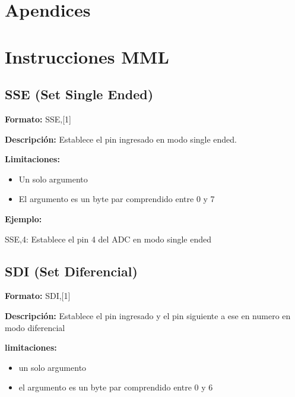 \documentclass{article}
\theoremstyle{definition}
\theoremstyle{remark}
\begin{document}
\clearpage


\section{Apendices} %
\label{sec:apendices}


\appendix
\section{Instrucciones MML} %
\label{sec:instrucciones_mml}


\subsection{SSE (Set Single Ended)} %
\label{sub:sse_set_single_ended}


\textbf{Formato:} SSE,[1]

\textbf{Descripci\'on:}
Establece el pin ingresado en modo single ended.

\textbf{Limitaciones:}
\begin{itemize}
  \item Un solo argumento
  \item El argumento es un byte par comprendido entre 0 y 7
\end{itemize}

\textbf{Ejemplo:}

SSE,4: Establece el pin 4 del ADC en modo single ended


\subsection{SDI (Set Diferencial)} %
\label{sub:sdi_set_diferencial}


\textbf{Formato:} SDI,[1]

\textbf{Descripci\'on:}
Establece el pin ingresado y el pin siguiente a ese en numero en modo diferencial

\textbf{limitaciones:}
\begin{itemize}
  \item un solo argumento
  \item el argumento es un byte par comprendido entre 0 y 6
\end{itemize}
\end{document}
